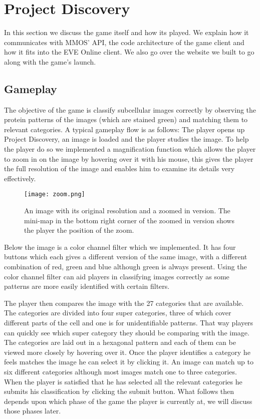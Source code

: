 \section{Project Discovery}\label{sec:projectdiscovery}

	In this section we discuss the game itself and how its played. We explain how it communicates with MMOS' API, the code architecture of the game client and how it fits into the EVE Online client. We also go over the website we built to go along with the game's launch.

\subsection{Gameplay}
	The objective of the game is classify subcellular images correctly by observing the protein patterns of the images (which are stained green) and matching them to relevant categories. A typical gameplay flow is as follows: The player opens up Project Discovery, an image is loaded and the player studies the image. To help the player do so we implemented a magnification function which allows the player to zoom in on the image by hovering over it with his mouse, this gives the player the full resolution of the image and enables him to examine its details very effectively.

	\begin{figure}[H]
	  \centering
	  \graphicspath{ {./graphics/} }
	  \centerline{\texttt{[image: zoom.png]}}
	  \caption{\label{fig:zoom}An image with its original resolution and a zoomed in version. The mini-map in the bottom right corner of the zoomed in version shows the player the position of the zoom.}
	\end{figure}

	Below the image is a color channel filter which we implemented. It has four buttons which each gives a different version of the same image, with a different combination of red, green and blue although green is always present. Using the color channel filter can aid players in classifying images correctly as some patterns are more easily identified with certain filters.

	The player then compares the image with the 27 categories that are available. The categories are divided into four super categories, three of which cover different parts of the cell and one is for unidentifiable patterns. That way players can quickly see which super category they should be comparing with the image. The categories are laid out in a hexagonal pattern and each of them can be viewed more closely by hovering over it. Once the player identifies a category he feels matches the image he can select it by clicking it. An image can match up to six different categories although most images match one to three categories. When the player is satisfied that he has selected all the relevant categories he submits his classification by clicking the submit button. What follows then depends upon which phase of the game the player is currently at, we will discuss those phases later.

